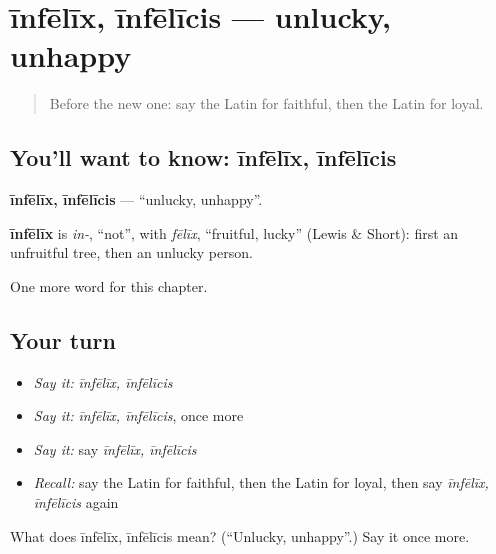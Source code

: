 \section[īnfēlīx, īnfēlīcis]{īnfēlīx, īnfēlīcis — unlucky, unhappy}

\label{lesson:LA-C243-infelix}



\begin{quote}
Before the new one: say the Latin for faithful, then the Latin for loyal.
\end{quote}

\subsection*{You'll want to know: īnfēlīx, īnfēlīcis}
\textbf{īnfēlīx, īnfēlīcis} — \textquotedblleft{}unlucky, unhappy\textquotedblright{}.

\begin{cousinweb}
\textbf{īnfēlīx} is \emph{in-}, \textquotedblleft{}not\textquotedblright{}, with \emph{fēlīx}, \textquotedblleft{}fruitful, lucky\textquotedblright{} (Lewis \& Short): first an unfruitful tree, then an unlucky person.
\end{cousinweb}

\begin{grammarlens}[title={What you've built}]
One more word for this chapter.
\end{grammarlens}

\subsection*{Your turn}
\begin{itemize}
\raggedright
  \item \emph{Say it:} \emph{īnfēlīx, īnfēlīcis}
  \item \emph{Say it:} \emph{īnfēlīx, īnfēlīcis}, once more
  \item \emph{Say it:} say \emph{īnfēlīx, īnfēlīcis}
  \item \emph{Recall:} say the Latin for faithful, then the Latin for loyal, then say \emph{īnfēlīx, īnfēlīcis} again
\end{itemize}

\begin{tcolorbox}[breakable,colback=teal!4,colframe=teal!35!black,title={Before you move on}]
What does īnfēlīx, īnfēlīcis mean? (\textquotedblleft{}Unlucky, unhappy\textquotedblright{}.) Say it once more.
\end{tcolorbox}
